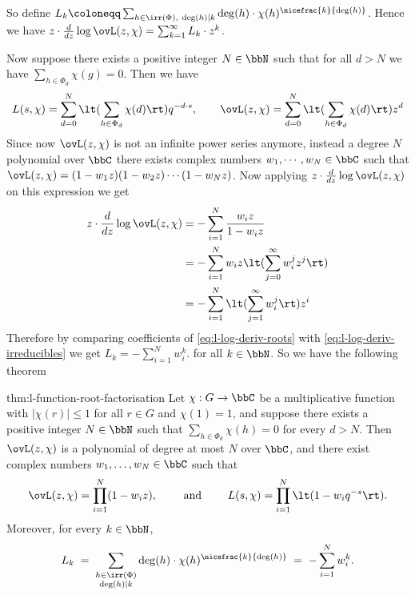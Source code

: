 So define $L_k\coloneqq  \sum_{h\in\irr(\Phi),\ \deg(h)\mid k}\deg(h)\cdot \chi(h)^{\nicefrac{k}{\deg(h)}}$. Hence we have $z\cdot \frac{d}{dz}\log \ovL(z,\chi)=\sum_{k=1}^{\infty}L_k\cdot z^k$. 

Now suppose there exists a positive integer $N\in\bbN$ such that for all $d>N$ we have $\sum_{h\in\Phi_d}\chi(g)=0$. Then we have $$L(s,\chi)=\sum_{d=0}^N \lt(\sum_{h\in\Phi_d}\chi(d)\rt)q^{-d\cdot s},\qquad  \ovL(z,\chi)=\sum_{d=0}^N \lt(\sum_{h\in\Phi_d}\chi(d)\rt)z^d$$
Since now $\ovL(z,\chi)$ is not an infinite power series anymore, instead a degree $N$ polynomial over $\bbC$ there exists complex numbers $w_1,\cdots, w_N\in\bbC$ such that $\ovL(z,\chi)=(1-w_1 z)(1-w_2 z)\cdots (1-w_N z)$. Now applying $z\cdot \frac{d}{dz}\log \ovL(z,\chi)$ on this expression we get \begin{align}
  z\cdot \frac{d}{dz}\log \ovL(z,\chi) & = -\sum_{i=1}^N\frac{w_iz}{1-w_iz}\notag\\
  & = -\sum_{i=1}^N w_iz\lt(\sum_{j=0}^{\infty}w_i^jz^j\rt)\notag\\
  & = -\sum_{i=1}^N\lt(\sum_{j=1}^{\infty}w_i^j\rt)z^i \label{eq:l-log-deriv-roots}
\end{align}
Therefore by comparing coefficients of \eqref{eq:l-log-deriv-roots} with \eqref{eq:l-log-deriv-irreducibles} we get $L_k=-\sum_{i=1}^{N}w_i^k$. for all $k\in\bbN$. So we have the following theorem
\begin{Theorem}{}{thm:l-function-root-factorisation}
  Let $\chi:G\to\bbC$ be a multiplicative function with $|\chi(r)|\leq 1$ for all $r\in G$ and $\chi(1)=1$, and suppose there exists a positive integer $N\in\bbN$ such that $\sum_{h\in\Phi_d}\chi(h)=0$ for every $d>N$. Then $\ovL(z,\chi)$ is a polynomial of degree at most $N$ over $\bbC$, and there exist complex numbers $w_1,\dots,w_N\in\bbC$ such that
  $$\ovL(z,\chi)=\prod_{i=1}^{N}(1-w_iz), \qquad\text{ and }\qquad L(s,\chi)=\prod_{i=1}^{N}\lt(1-w_iq^{-s}\rt).$$
  Moreover, for every $k\in\bbN$,
  $$L_k\;=\;\sum_{\substack{h\in\irr(\Phi)\\ \deg(h)\mid k}}\deg(h)\cdot \chi(h)^{\nicefrac{k}{\deg(h)}}\;=\;-\sum_{i=1}^{N}w_i^k.$$
\end{Theorem}
